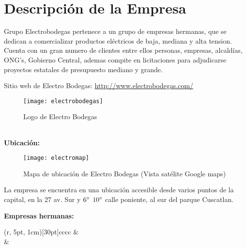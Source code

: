 
\section{Descripci\'on de la Empresa}

Grupo Electrobodegas pertenece a un grupo de empresas hermanas, que se dedican a comercializar productos eléctricos de baja, mediana y alta tension. Cuenta con un gran numero de clientes entre ellos personas, empresas, alcaldías, ONG’s, Gobierno Central, ademas compite en licitaciones para adjudicarse proyectos estatales de presupuesto mediano y grande.

\begin{center}
  Sitio web de Electro Bodegas: \url{http://www.electrobodegas.com/}

  \begin{figure}[h!]
    \centering
    \texttt{[image: electrobodegas]}
    \caption{Logo de Electro Bodegas}
  \end{figure}
\end{center}

\\
\textbf{Ubicaci\'on:}

\begin{figure}
  \centering
  \texttt{[image: electromap]}
  \caption{Mapa de ubicación de Electro Bodegas (Vista satélite Google maps)}
\end{figure}

La empresa se encuentra en una ubicación accesible desde varios puntos de la capital, en la 27 av. Sur y $6\degree$ $10\degree$ calle poniente, al sur del parque Cuscatlan.

\textbf{Empresas hermanas:}

\begin{TAB}(r, 5pt, 1cm)[30pt]{cc}{cc}
  &
  \\
  &
  \\
\end{TAB}

